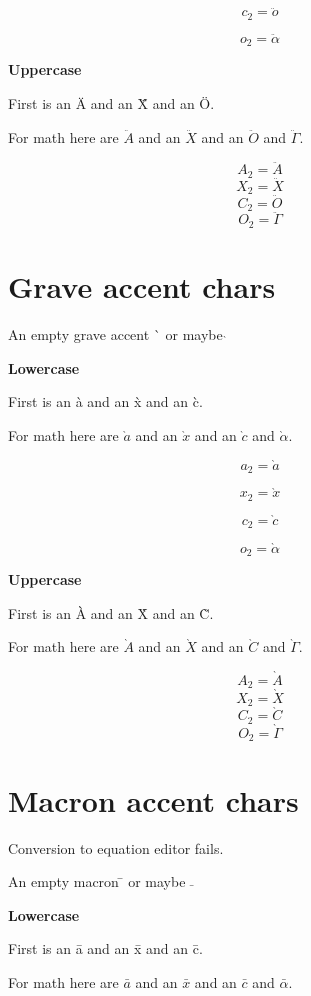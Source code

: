 \documentclass{article}
\begin{document}
$$c_2=\ddot{o}$$

$$o_2=\ddot{\alpha}$$

\textbf{Uppercase}

First is an \"{A} and an \"{X} and an \"{O}.

For math here are $\ddot{A}$ and an $\ddot{X}$ and an $\ddot{O}$ and $\ddot{\Gamma}$.

$$A_2=\ddot{A}$$
$$X_2=\ddot{X}$$
$$C_2=\ddot{O}$$
$$O_2=\ddot{\Gamma}$$




\section{Grave accent chars}

An empty grave accent \`{} or maybe $\grave{}$

\textbf{Lowercase}

First is an \`{a} and an \`{x} and an \`{c}.

For math here are $\grave{a}$ and an $\grave{x}$ and an $\grave{c}$ and $\grave{\alpha}$.

$$a_2=\grave{a}$$

$$x_2=\grave{x}$$

$$c_2=\grave{c}$$

$$o_2=\grave{\alpha}$$

\textbf{Uppercase}

First is an \`{A} and an \`{X} and an \`{C}.

For math here are $\grave{A}$ and an $\grave{X}$ and an $\grave{C}$ and $\grave{\Gamma}$.

$$A_2=\grave{A}$$
$$X_2=\grave{X}$$
$$C_2=\grave{C}$$
$$O_2=\grave{\Gamma}$$




\section{Macron accent chars}

Conversion to equation editor fails.

An empty macron \={} or maybe $\bar{}$

\textbf{Lowercase}

First is an \={a} and an \={x} and an \={c}.

For math here are $\bar{a}$ and an $\bar{x}$ and an $\bar{c}$ and $\bar{\alpha}$.
\end{document}
